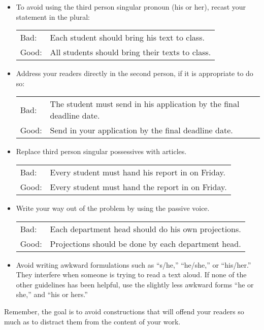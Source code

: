 \begin{itemize}
\item To avoid using the third person singular pronoun (his or her),
  recast your statement in the plural:

\begin{tabular}{lp{0.9\hsize}}
Bad:  & Each student should bring his text to class. \\
Good: & All students should bring their texts to class. \\
\end{tabular}



\item Address your readers directly in the second person, if it is
  appropriate to do so:

\begin{tabular}{lp{0.9\hsize}}
Bad:  & The student must send in his application by the final deadline date. \\
Good: & Send in your application by the final deadline date. \\
\end{tabular}



\item Replace third person singular possessives with articles.

\begin{tabular}{lp{0.9\hsize}}
Bad:  & Every student must hand his report in on Friday. \\
Good: & Every student must hand the report in on Friday. \\
\end{tabular}



\item Write your way out of the problem by using the passive voice.

\begin{tabular}{lp{0.9\hsize}}
Bad:  & Each department head should do his own projections. \\
Good: & Projections should be done by each department head. \\
\end{tabular}



\item Avoid writing awkward formulations such as ``s/he,'' ``he/she,''
  or ``his/her.''  They interfere when someone is trying to read a
  text aloud.  If none of the other guidelines has been helpful, use
  the slightly less awkward forms ``he or she,'' and ``his or hers.''

\end{itemize}
Remember, the goal is to avoid constructions that will offend your
readers so much as to distract them from the content of your work.




